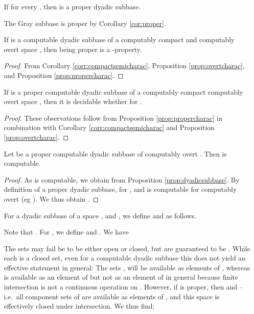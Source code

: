 \documentclass{eptcs-modified}
\begin{document}
\begin{corollary}\label{cor:proper}
  If  for every , then  is a proper dyadic subbase.
\end{corollary}

\begin{example}
  The Gray subbase is proper by Corollary \ref{cor:proper}.
\end{example}

\begin{proposition}\label{prop:pi02}
If  is a computable dyadic subbase of a computably compact and computably overt space , then  being proper is a -property.
\end{proposition}
\begin{proof}
  From
  Corollary \ref{corr:compactsemicharac}, Proposition \ref{prop:overtcharac},
  and Proposition \ref{prop:propercharac}.
\end{proof}

\begin{proposition}\label{prop:decidable}
If  is a proper computable dyadic subbase of a computably compact computably overt space , then
it is decidable whether  for .
\end{proposition}
\begin{proof}
These observations follow from Proposition \ref{prop:propercharac} in combination with Corollary \ref{corr:compactsemicharac} and Proposition \ref{prop:overtcharac}.
\end{proof}


\begin{corollary}
\label{corr:dyadicsubbase}
Let  be a proper computable dyadic subbase of computably overt . Then  is computable.
\begin{proof}
As  is computable, we obtain  from Proposition \ref{prop:dyadicsubbase}. By definition of a proper dyadic subbase,  for , and  is computable for computably overt  (eg \cite{pauly-synthetic}). We thus obtain .
\end{proof}
\end{corollary}

\begin{definition}
\label{def:excase}
For a dyadic subbase  of a space ,
 and ,
we define 
and  as follows.

Note that
.
For , we define  and  .  We have

\end{definition}


The sets  may fail be to be either open or closed, but are guaranteed to be . While each  is a closed set, even for a computable dyadic subbase this does not yield an effective statement in general: The sets ,  will be available as elements of , whereas  is available as an element of 
but not as an element of  in general because finite intersection is not a continuous operation on . However, if  is proper, then  and  -- i.e.~all component sets of  are available as elements of , and this space is effectively closed under intersection. We thus find:
\end{document}
